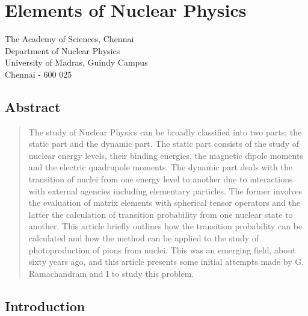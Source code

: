 \chapter[Elements of Nuclear Physics]{Elements of Nuclear Physics}\label{chap3}


\begin{center}
The Academy of Sciences, Chennai\\
Department of Nuclear Physics\\
University of Madras, Guindy Campus\\
Chennai - 600 025
\end{center}

\section*{Abstract}

\begin{quote}
The study of Nuclear Physics can be broadly classified into two parts; the static part and the dynamic part. The static part consists of the study of nuclear energy levels, their binding energies, the magnetic dipole moments and the electric quadrupole moments. The dynamic part deals with the transition of nuclei from one energy level to another due to interactions with external agencies including elementary particles. The former involves the evaluation of matrix elements with spherical tensor operators and the latter the calculation of transition probability from one nuclear state to another. This article briefly outlines how the transition probability can be calculated and how the method can be applied to the study of photoproduction of pions from nuclei. This was an emerging field, about sixty years ago, and this article presents some initial attempts made by G. Ramachandram and I to study this problem.
\end{quote}

\section{Introduction}\label{chap3-sec1}
 
